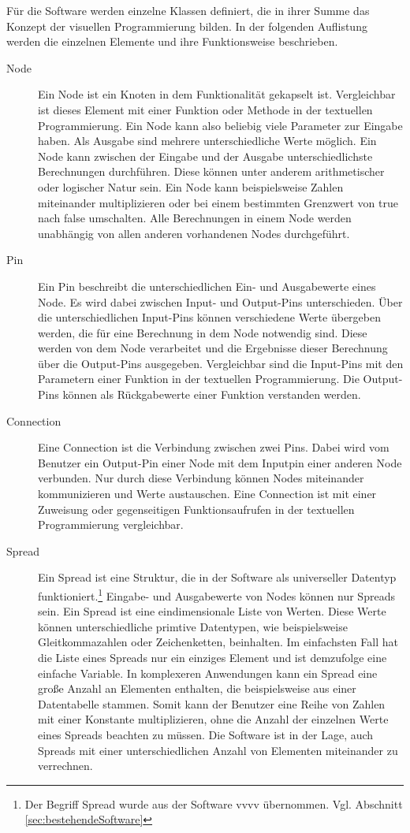 \documentclass[a4paper, 
               12pt,
               DIV=calc,
               version=first,
               pdftex,
               headsepline,
               footsepline,
               bibtotocnumbered,
               liststotocnumbered]{scrreprt}
\begin{document}
Für die Software werden einzelne Klassen definiert, die in ihrer Summe das Konzept der visuellen
Programmierung bilden. In der folgenden Auflistung werden die einzelnen
Elemente und ihre Funktionsweise beschrieben.
\begin{description}
\item[Node]
Ein Node ist ein Knoten in dem Funktionalität gekapselt ist. Vergleichbar ist dieses
Element mit einer Funktion oder Methode in der textuellen Programmierung. Ein Node kann also
beliebig viele Parameter zur Eingabe haben. Als Ausgabe sind mehrere unterschiedliche Werte möglich.
Ein Node kann zwischen der Eingabe und der Ausgabe unterschiedlichste Berechnungen durchführen.
Diese können unter anderem arithmetischer oder logischer Natur sein. Ein Node kann beispielsweise
Zahlen miteinander multiplizieren oder bei einem bestimmten Grenzwert von true nach false
umschalten.
Alle Berechnungen in einem Node werden unabhängig von allen anderen vorhandenen Nodes durchgeführt.
\item[Pin]
Ein Pin beschreibt die unterschiedlichen Ein- und Ausgabewerte eines Node.
Es wird dabei zwischen Input- und Output-Pins unterschieden. Über die unterschiedlichen
Input-Pins können verschiedene Werte übergeben werden, die für eine Berechnung in dem Node notwendig sind.
Diese werden von dem Node verarbeitet und die Ergebnisse dieser Berechnung
über die Output-Pins ausgegeben.
Vergleichbar sind die Input-Pins mit den Parametern einer Funktion in der textuellen Programmierung.
Die Output-Pins können als Rückgabewerte einer Funktion verstanden werden.
\item[Connection]
Eine Connection ist die Verbindung zwischen zwei Pins. Dabei wird vom Benutzer ein Output-Pin einer
Node mit dem Inputpin einer anderen Node verbunden. Nur durch diese Verbindung können
Nodes miteinander kommunizieren und Werte austauschen. Eine Connection
ist mit einer Zuweisung oder gegenseitigen Funktionsaufrufen in der textuellen Programmierung vergleichbar.
\item[Spread]
Ein Spread ist eine Struktur, die in der Software als universeller Datentyp funktioniert.\footnote{Der
Begriff Spread wurde aus der Software vvvv übernommen. Vgl. Abschnitt \ref{sec:bestehendeSoftware}}
Eingabe- und Ausgabewerte von Nodes können nur Spreads sein. Ein Spread ist eine 
eindimensionale Liste von Werten. Diese Werte können unterschiedliche primtive Datentypen,
wie beispielsweise Gleitkommazahlen oder Zeichenketten, beinhalten. Im einfachsten Fall hat
die Liste eines Spreads nur ein einziges Element und ist demzufolge eine einfache Variable. In komplexeren
Anwendungen kann ein Spread eine große Anzahl an Elementen enthalten, die beispielsweise
aus einer Datentabelle stammen. Somit kann der Benutzer eine Reihe von Zahlen mit
einer Konstante multiplizieren, ohne die Anzahl der einzelnen Werte eines Spreads
beachten zu müssen. Die Software ist in der Lage, auch Spreads mit einer unterschiedlichen
Anzahl von Elementen miteinander zu verrechnen.
\end{description}
\end{document}
